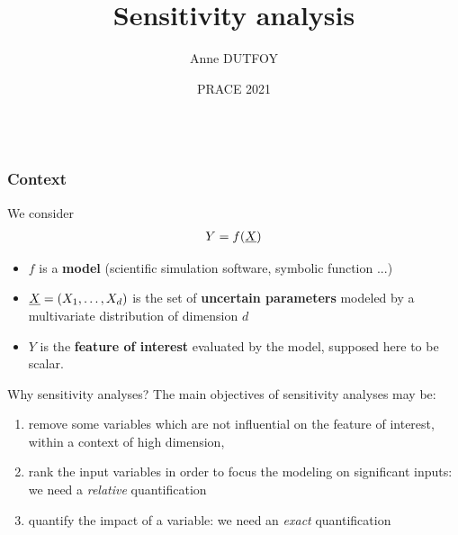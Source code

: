 \documentclass[8pt]{beamer}
\title[Sensitivity analysis]{Sensitivity analysis}
\author[Anne Dutfoy]{
 Anne DUTFOY
}
\institute[]{
 EDF R\&D PERICLES. \\
 anne.dutfoy@edf.Fr
}
\date[PRACE 2021]{PRACE 2021}
\begin{document}

\begin{frame}[plain]
  \begin{columns}
    \titlepage
    \vfill
  \end{columns}
\end{frame}






\begin{frame}
  \frametitle{Context}
\small
We consider
\alert{
\begin{align*}
 Y=f({\underline{X}})
\end{align*}
}
\begin{itemize}
  \item $f$ is a {\bf model} (scientific simulation software, symbolic function ...)
  \item ${\underline{X}}=(X_1, \dots, X_d)$ is the set of  {\bf uncertain parameters } modeled by a multivariate distribution of dimension $d$
  \item $Y$ is the {\bf feature of interest} evaluated by the model, supposed here to be scalar.
\end{itemize}

  \begin{block}{Why sensitivity analyses?}
  The main objectives of sensitivity analyses may be:
\begin{enumerate}
 \item \alert{remove some variables} which are not influential on the feature of interest, within a context of high dimension,
 \item\alert{ rank the input variables } in order to focus the modeling on significant inputs: we need a  \emph{relative} quantification
 \item \alert{quantify the impact of a variable}: we need an \emph{exact} quantification
\end{enumerate}
\end{block}
\end{frame}
\end{document}
